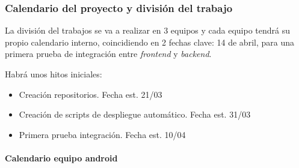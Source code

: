 \documentclass{article}
\begin{document}
\subsubsection{Calendario del proyecto y división del trabajo}


La división del trabajos se va a realizar en 3 equipos y cada equipo tendrá su propio calendario interno, coincidiendo en 2 fechas clave:
14 de abril, para una primera prueba de integración entre \textit{frontend} y \textit{backend}.

Habrá unos hitos iniciales:
\begin{itemize}
    \item Creación repositorios. Fecha est. 21/03
    \item Creación de scripts de despliegue automático. Fecha est. 31/03
    \item Primera prueba integración. Fecha est. 10/04
\end{itemize}

\paragraph{Calendario equipo android}
\end{document}
